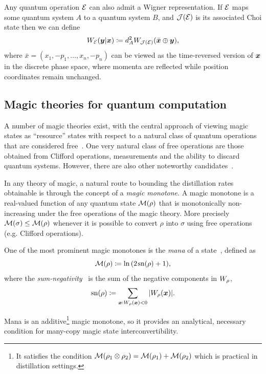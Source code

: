 \documentclass[pra,
aps,
twocolumn,
superscriptaddress,
groupedaddress,
nofootinbib,
reprint
]{revtex4-1}
\begin{document}
Any quantum operation ${\mathcal E}$ can also admit a Wigner representation. If ${\mathcal E}$ maps some quantum system $A$ to a quantum system $B$, and $\mathcal{J}({\mathcal E})$ is its associated Choi state then we can define
\begin{equation}
W_{{\mathcal E}}(\boldsymbol{y} |\boldsymbol{x}) \coloneqq d_A^2 W_{\mathcal{J}({\mathcal E})}(\bar{\boldsymbol{x}} \oplus \boldsymbol{y}),
\end{equation}
where $\bar{x} =(x_1, -p_1, \dots , x_n, -p_n)$ can be viewed as the time-reversed version of $\boldsymbol{x}$ in the discrete phase space, where momenta are reflected while position coordinates remain unchanged.

\subsection{Magic theories for quantum computation}
\label{sec:mono}

A number of magic theories exist, with the central approach of viewing magic states as ``resource'' states with respect to a natural class of quantum operations that are considered free~\cite{Gour_2019}. One very natural class of free operations are those obtained from Clifford operations, measurements and the ability to discard quantum systems. However, there are also other noteworthy candidates~\cite{cit:ahmadi, cit:seddon, Wang_2019}.

In any theory of magic, a natural route to bounding the distillation rates obtainable is through the concept of a \emph{magic monotone}. A magic monotone is a real-valued function of any quantum state ${\mathcal M}(\rho)$ that is monotonically non-increasing under the free operations of the magic theory. More precisely ${\mathcal M}(\sigma) \le {\mathcal M}(\rho)$ whenever it is possible to convert $\rho$ into $\sigma$ using free operations (e.g. Clifford operations).

One of the most prominent magic monotones is the \emph{mana} of a state~\cite{cit:veitch2}, defined as
\begin{equation}
    { {\mathcal M} (\rho)} \coloneqq \ln{(2\hspace{1pt} {{\rm{sn}}(\rho)} +1)},
\end{equation}
where the \emph{sum-negativity}~\cite{cit:veitch2} is the sum of the negative components in $\W{\rho}$,
\begin{equation}
    \sn{\rho} \coloneqq \sum\limits_{\bmx: \W[\bmx]{\rho} < 0} \abs{\W[\bmx]{\rho}}.
\end{equation}

Mana is an additive\footnote{It satisfies the condition ${{\mathcal M}(\rho_1 \otimes \rho_2)} = {{\mathcal M}(\rho_1)} + {{\mathcal M}(\rho_2)}$ which is practical in distillation settings.} magic monotone, so it provides an analytical, necessary condition for many-copy magic state interconvertibility.
\end{document}
